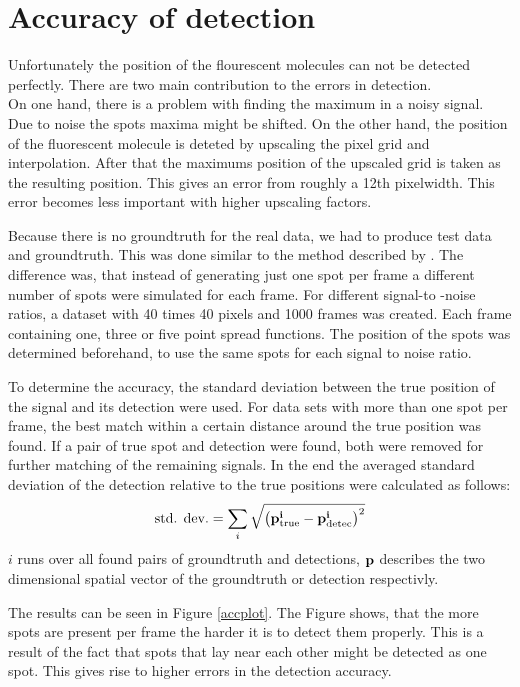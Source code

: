 \section{Accuracy of detection}
Unfortunately the position of the flourescent molecules can not be detected
perfectly. There are two main contribution to the errors in detection.\\
On one hand, there is a problem with finding the maximum in a noisy signal. Due to
noise the spots maxima might be shifted.\newline
On the other hand, the position of the fluorescent molecule is deteted by upscaling the pixel grid and interpolation.
After that the maximums position of the upscaled grid is taken as the resulting
position. This gives an error from roughly a 12th pixelwidth. This error becomes less important with higher upscaling factors.\newline

Because there is no groundtruth for the real data, we had to produce test data and groundtruth. This was done similar to the method described by \cite{simulated}. The difference was, that instead of generating just one spot per frame a different number of spots were simulated for each frame. For different signal-to -noise ratios, a dataset with 40 times 40 pixels and 1000 frames was created. Each frame containing one, three or five point spread functions. The position of the spots was determined beforehand, to use the same spots for each signal to noise ratio.\newline

To determine the accuracy, the standard deviation between the true position of the signal and its detection were used. For data sets with more than one spot per frame, the best match within a certain distance around the true position was found. If a pair of true spot and detection were found, both were removed for further matching of the remaining signals. In the end the averaged standard deviation of the detection relative to the true positions were calculated as follows:
\begin{align}
	\text{std. dev.} = \sum_i \sqrt{\left(\bf{p}_{\text{true}}^i - \bf{p}_{\text{detec}}^i\right)^2}
\end{align}
$i$ runs over all found pairs of groundtruth and detections, $\bf{p}$ describes the two dimensional spatial vector of the groundtruth or detection respectivly.\newline

The results can be seen in Figure \ref{accplot}. The Figure shows, that the more spots are present per frame the harder it is to detect them properly. This is a result of the fact that spots that lay near each other might be detected as one spot. This gives rise to higher errors in the detection accuracy.


